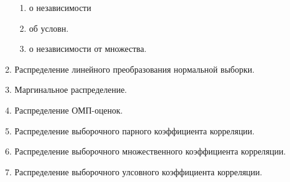 \documentclass[a4paper]{article}
\begin{document}
\begin{enumerate}
\begin{enumerate}
		\item{о независимости}
		\item{об условн.}
		\item{о независимости от множества.}
	\end{enumerate}
	\item{Распределение линейного преобразования нормальной выборки.}
	\item{Маргинальное распределение.}
	\item{Распределение ОМП-оценок.}
	\item{Распределение выборочного парного коэффициента корреляции.}
	\item{Распределение выборочного множественного коэффициента корреляции.}
	\item{Распределение выборочного улсовного коэффициента корреляции.}
\end{enumerate}
\end{document}
